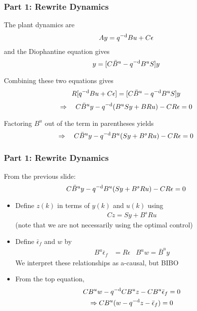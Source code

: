 \begin{frame}
    \frametitle{Part 1: Rewrite Dynamics}

    The plant dynamics are
    \begin{align*}
        Ay = q^{-\textrm{d}} Bu + C \epsilon
    \end{align*}
    and the Diophantine equation gives
    \begin{align*}
        [RA]y = [C\bar{B}^u - \qmd B^u S] y
    \end{align*}
    \paused

    Combining these two equations gives
    \begin{align*}
        R [q^{-\textrm{d}} Bu + C \epsilon] = [C\bar{B}^u - q^{-\textrm{d}} B^u S] y
    \end{align*}
    \paused
    \begin{align*}
        \Rightarrow \quad C\bar{B}^u y - q^{-\textrm{d}}(B^u Sy + BRu) - CR\epsilon = 0
    \end{align*}
    \paused

    Factoring $B^u$ out of the term in parentheses yields
    \begin{align*}
        \Rightarrow \quad C\bar{B}^u y - q^{-\textrm{d}} B^u (Sy + B^s Ru) - CR\epsilon = 0
    \end{align*}
\end{frame}

\begin{frame}
    \frametitle{Part 1: Rewrite Dynamics}

    From the previous slide:
    \begin{align*}
        C\bar{B}^u y - q^{-\textrm{d}} B^u (Sy + B^s Ru) - CR\epsilon = 0
    \end{align*}

    \begin{itemize}
        \item
        Define $z(k)$ in terms of $y(k)$ and $u(k)$ using
        \begin{align*}
            Cz = Sy + B^s Ru
        \end{align*}
        (note that we are not necessarily using the optimal control)
        \pause

        \item
        Define $\bar{\epsilon}_f$ and $w$ by
        \begin{align*}
            B^u \bar{\epsilon}_f & = R\epsilon
                & B^u w = \bar{B}^u y
        \end{align*}
        We interpret these relationships as a-causal, but BIBO
        \pause

        \item
        From the top equation,
        \begin{gather*}
            CB^u w - q^{-\textrm{d}} CB^u z - CB^u \bar{\epsilon}_f = 0 \\
            \Rightarrow CB^u (w - q^{-\textrm{d}} z - \bar{\epsilon}_f) = 0
        \end{gather*}
    \end{itemize}
\end{frame}

